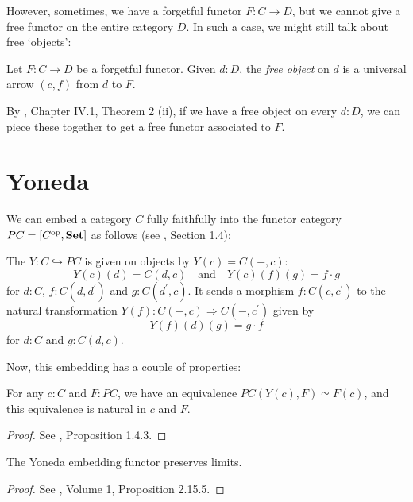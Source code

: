 However, sometimes, we have a forgetful functor $ F: C \to D $, but we cannot give a free functor on the entire category $ D $. In such a case, we might still talk about free `objects':
\begin{definition}
  Let $ F: C \to D $ be a forgetful functor. Given $ d: D $, the \textit{free object} on $ d $ is a universal arrow $ (c, f) $ from $ d $ to $ F $.
\end{definition}

\begin{remark}
  By \autocite{MacLane}, Chapter IV.1, Theorem 2 (ii), if we have a free object on every $ d: D $, we can piece these together to get a free functor associated to $ F $.
\end{remark}

\section{Yoneda}
We can embed a category $ C $ fully faithfully into the functor category $ P C = [C^{\text{op}}, \mathbf{Set}] $ as follows (see \autocite{Kashiwara}, Section 1.4):
\begin{definition}\label{def:Yoneda-embedding}
  The  $ Y : C \hookrightarrow P C $ is given on objects by $ Y(c) = C(-, c) $:
  \[ Y(c)(d) = C(d, c) \quad \text{and} \quad Y(c)(f)(g) = f \cdot g \]
  for $ d: C $, $ f: C(d, d^\prime) $ and $ g: C(d^\prime, c) $. It sends a morphism $ f: C(c, c^\prime) $ to the natural transformation $ Y(f): C(-, c) \Rightarrow C(-, c^\prime) $ given by
  \[ Y(f)(d)(g) = g \cdot f \]
  for $ d: C $ and $ g: C(d, c) $.
\end{definition}

Now, this embedding has a couple of properties:
\begin{lemma}
  For any $ c: C $ and $ F : PC $, we have an equivalence $ PC(Y(c), F) \simeq F(c) $, and this equivalence is natural in $ c $ and $ F $.
\end{lemma}
\begin{proof}
  See \autocite{Kashiwara}, Proposition 1.4.3.
\end{proof}

\begin{lemma}
  The Yoneda embedding functor preserves limits.
\end{lemma}
\begin{proof}
  See \autocite{borceux}, Volume 1, Proposition 2.15.5.
\end{proof}

